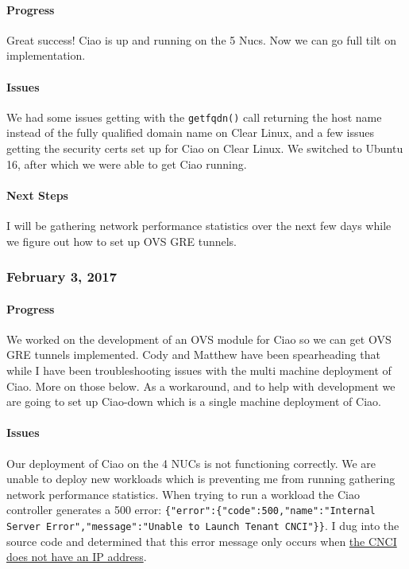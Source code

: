\documentclass[10pt,onecolumn,journal,draftclsnofoot]{IEEEtran}
\begin{document}
\paragraph{Progress} 

Great success! Ciao is up and running on the 5 Nucs. Now we can go full
tilt on implementation.

\paragraph{Issues} 

We had some issues getting with the \lstinline!getfqdn()! call returning
the host name instead of the fully qualified domain name on Clear Linux,
and a few issues getting the security certs set up for Ciao on Clear
Linux. We switched to Ubuntu 16, after which we were able to get Ciao
running.

\paragraph{Next Steps} 

I will be gathering network performance statistics over the next few
days while we figure out how to set up OVS GRE tunnels.

\subsubsection{February 3, 2017} 

\paragraph{Progress} 

We worked on the development of an OVS module for Ciao so we can get OVS
GRE tunnels implemented. Cody and Matthew have been spearheading that
while I have been troubleshooting issues with the multi machine
deployment of Ciao. More on those below. As a workaround, and to help
with development we are going to set up Ciao-down which is a single
machine deployment of Ciao.

\paragraph{Issues} 

Our deployment of Ciao on the 4 NUCs is not functioning correctly. We
are unable to deploy new workloads which is preventing me from running
gathering network performance statistics. When trying to run a workload
the Ciao controller generates a 500 error:
\lstinline!{"error":{"code":500,"name":"Internal Server Error","message":"Unable to Launch Tenant CNCI"}}!.
I dug into the source code and determined that this error message only
occurs when
\href{https://github.com/01org/ciao/blob/6eb98ce70d8b923bcdcedf628d68dd36645f9b87/ciao-controller/command.go\#L125}{the
CNCI does not have an IP address}.
\end{document}
